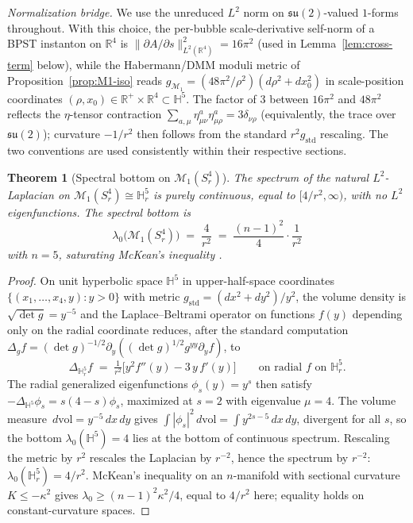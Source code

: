 \documentclass[11pt,letterpaper]{article}
\newtheorem{theorem}{Theorem}[section]
\theoremstyle{definition}
\newcommand{\bbR}{\mathbb{R}}
\newcommand{\bbH}{\mathbb{H}}
\newcommand{\cM}{\mathcal{M}}
\newcommand{\Lap}{\Delta}
\newcommand{\dvol}{\,d\mathrm{vol}}
\begin{document}
\noindent\emph{Normalization bridge.} We use the unreduced $L^2$ norm on $\mathfrak{su}(2)$-valued $1$-forms throughout. With this choice, the per-bubble scale-derivative self-norm of a BPST instanton on $\bbR^4$ is $\|\partial A/\partial s\|^2_{L^2(\bbR^4)} = 16\pi^2$ (used in Lemma~\ref{lem:cross-term} below), while the Habermann/DMM moduli metric of Proposition~\ref{prop:M1-iso} reads $g_{\cM_1} = (48\pi^2/\rho^2)(d\rho^2 + dx_0^2)$ in scale-position coordinates $(\rho, x_0) \in \bbR^+ \times \bbR^4 \subset \bbH^5$. The factor of $3$ between $16\pi^2$ and $48\pi^2$ reflects the $\eta$-tensor contraction $\sum_{a,\mu}\eta^a_{\mu\nu}\eta^a_{\mu\rho} = 3\delta_{\nu\rho}$ (equivalently, the trace over $\mathfrak{su}(2)$); curvature $-1/r^2$ then follows from the standard $r^2 g_{\mathrm{std}}$ rescaling. The two conventions are used consistently within their respective sections.

\begin{theorem}[Spectral bottom on $\cM_1(S^4_r)$]\label{thm:M1-spectrum}
The spectrum of the natural $L^2$-Laplacian on $\cM_1(S^4_r) \cong \bbH^5_r$ is purely continuous, equal to $[4/r^2, \infty)$, with no $L^2$ eigenfunctions. The spectral bottom is
\[
\lambda_0\bigl(\cM_1(S^4_r)\bigr) \;=\; \frac{4}{r^2} \;=\; \frac{(n-1)^2}{4}\cdot\frac{1}{r^2}
\]
with $n = 5$, saturating McKean's inequality \cite{McKean1970}.
\end{theorem}

\begin{proof}
On unit hyperbolic space $\bbH^5$ in upper-half-space coordinates $\{(x_1,\ldots,x_4, y) : y > 0\}$ with metric $g_{\mathrm{std}} = (dx^2 + dy^2)/y^2$, the volume density is $\sqrt{\det g} = y^{-5}$ and the Laplace--Beltrami operator on functions $f(y)$ depending only on the radial coordinate reduces, after the standard computation $\Lap_g f = (\det g)^{-1/2}\partial_y((\det g)^{1/2} g^{yy}\partial_y f)$, to
\[
\Lap_{\bbH^5_r} f \;=\; \tfrac{1}{r^2}\bigl[y^2 f''(y) - 3\,y\,f'(y)\bigr]\qquad\text{on radial $f$ on }\bbH^5_r.
\]
The radial generalized eigenfunctions $\phi_s(y) = y^s$ then satisfy $-\Lap_{\bbH^5}\phi_s = s(4-s)\phi_s$, maximized at $s = 2$ with eigenvalue $\mu = 4$. The volume measure $\dvol = y^{-5}\,dx\,dy$ gives $\int |\phi_s|^2\dvol = \int y^{2s-5}\,dx\,dy$, divergent for all $s$, so the bottom $\lambda_0(\bbH^5) = 4$ lies at the bottom of continuous spectrum. Rescaling the metric by $r^2$ rescales the Laplacian by $r^{-2}$, hence the spectrum by $r^{-2}$: $\lambda_0(\bbH^5_r) = 4/r^2$. McKean's inequality \cite{McKean1970} on an $n$-manifold with sectional curvature $K \le -\kappa^2$ gives $\lambda_0 \ge (n-1)^2\kappa^2/4$, equal to $4/r^2$ here; equality holds on constant-curvature spaces.
\end{proof}
\end{document}
